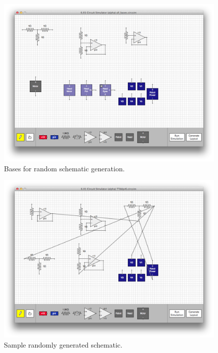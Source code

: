 \begin{figure}
\begin{center}
\includegraphics[width=\textwidth]{Images/auto_generation_bases.png}
\caption{Bases for random schematic generation.}
\label{fig:random_gen_bases}
\end{center}
\end{figure}

\begin{figure}
\begin{center}
\includegraphics[width=\textwidth]{Images/auto_generation_example.png}
\caption{Sample randomly generated schematic.}
\label{fig:example_random_schematic}
\end{center}
\end{figure}

